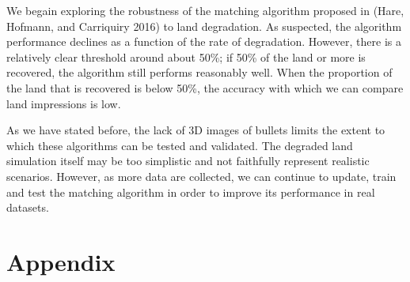 \documentclass[12pt,]{article}
\theoremstyle{definition}
\theoremstyle{definition}
\theoremstyle{definition}
\theoremstyle{remark}
\begin{document}
We begain exploring the robustness of the matching algorithm proposed in
(Hare, Hofmann, and Carriquiry 2016) to land degradation. As suspected,
the algorithm performance declines as a function of the rate of
degradation. However, there is a relatively clear threshold around about
50\%; if 50\% of the land or more is recovered, the algorithm still
performs reasonably well. When the proportion of the land that is
recovered is below 50\%, the accuracy with which we can compare land
impressions is low.

As we have stated before, the lack of 3D images of bullets limits the
extent to which these algorithms can be tested and validated. The
degraded land simulation itself may be too simplistic and not faithfully
represent realistic scenarios. However, as more data are collected, we
can continue to update, train and test the matching algorithm in order
to improve its performance in real datasets.

\clearpage

\section{Appendix}\label{appendix}
\end{document}

